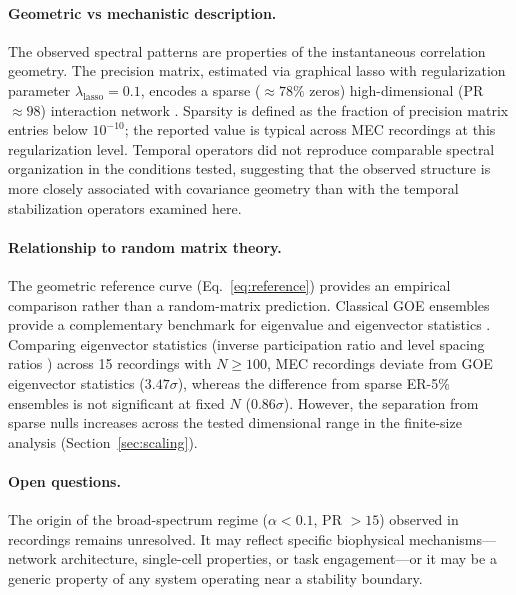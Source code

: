 \documentclass[aps,pre,reprint,twocolumn]{revtex4-2}
\newcommand{\mec}{\text{MEC}}
\begin{document}
\paragraph{Geometric vs mechanistic description.}
The observed spectral patterns are properties of the instantaneous correlation geometry. The precision matrix, estimated via graphical lasso \cite{friedman2008,meinshausen2006} with regularization parameter $\lambda_{\text{lasso}} = 0.1$, encodes a sparse ($\approx 78\%$ zeros) high-dimensional (PR $\approx 98$) interaction network \cite{dempster1972}. Sparsity is defined as the fraction of precision matrix entries below $10^{-10}$; the reported value is typical across MEC recordings at this regularization level. Temporal operators did not reproduce comparable spectral organization in the conditions tested, suggesting that the observed structure is more closely associated with covariance geometry than with the temporal stabilization operators examined here.

\paragraph{Relationship to random matrix theory.}
The geometric reference curve (Eq.~\ref{eq:reference}) provides an empirical comparison rather than a random-matrix prediction. Classical GOE ensembles provide a complementary benchmark for eigenvalue and eigenvector statistics \cite{wigner1955,mehta2004,bohigas1984,guhr1998}. Comparing eigenvector statistics (inverse participation ratio and level spacing ratios \cite{wegner1980,atas2013}) across 15 recordings with $N \ge 100$, MEC recordings deviate from GOE eigenvector statistics ($3.47\sigma$), whereas the difference from sparse ER-5\% ensembles is not significant at fixed $N$ ($0.86\sigma$). However, the separation from sparse nulls increases across the tested dimensional range in the finite-size analysis (Section~\ref{sec:scaling}).

\paragraph{Open questions.}
The origin of the broad-spectrum regime ($\alpha < 0.1$, PR $> 15$) observed in \mec{} recordings remains unresolved. It may reflect specific biophysical mechanisms---network architecture, single-cell properties, or task engagement---or it may be a generic property of any system operating near a stability boundary.
\end{document}
